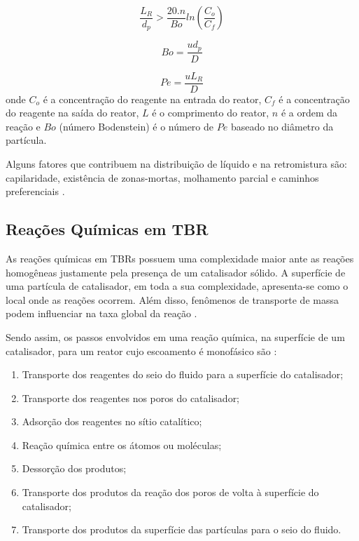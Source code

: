 \begin{equation}
\dfrac{L_{R}}{d_p} > \dfrac{20.n}{Bo}ln\left(\dfrac{C_o}{C_f}\right)
\label{eq:Mearscriterio}
\end{equation}

\begin{equation}
Bo = \dfrac{ud_p}{D}
\label{eq:Bodenstein}
\end{equation}

 \begin{equation}
 Pe = \dfrac{uL_{R}}{D}
 \label{eq:Peclet}
 \end{equation}
onde $C_o$ é a concentração do reagente na entrada do reator, $C_f$ é a
concentração do reagente na saída do reator, $L$ é o comprimento do reator, $n$
é a ordem da reação e $Bo$ (número Bodenstein) é o número de $Pe$ baseado no
diâmetro da partícula.


Alguns fatores que contribuem na distribuição de líquido e na retromistura são:
capilaridade, existência de zonas-mortas, molhamento parcial e caminhos
preferenciais \cite{Ranade2011}.

\subsection{Reações Químicas em TBR} \label{sec:reacoestbr}
 
As reações químicas em TBRs possuem uma complexidade maior ante as reações
homogêneas justamente pela presença de um catalisador sólido. A superfície
de uma partícula de catalisador, em toda a sua complexidade, apresenta-se
como o local onde as reações ocorrem. Além disso, fenômenos de transporte
de massa podem influenciar na taxa global da reação \cite{Froment2011}. 

Sendo assim, os passos envolvidos em uma reação química, na superfície de um
catalisador, para um reator cujo escoamento é monofásico são \cite{Froment2011}: 

\begin{enumerate}
\item Transporte dos reagentes do seio do fluido para a superfície
do catalisador;
\item Transporte dos reagentes nos poros do catalisador;
\item Adsorção dos reagentes no sítio catalítico;
\item Reação química entre os átomos ou moléculas;
\item Dessorção dos produtos;
\item Transporte dos produtos da reação dos poros de volta à
superfície do catalisador;
\item Transporte dos produtos da superfície das partículas para o seio do
fluido.
\end{enumerate} 

